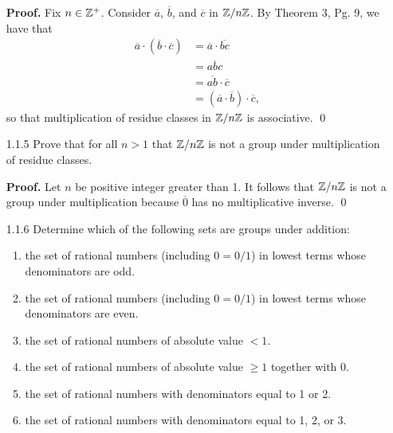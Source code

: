 \begin{enumerate}
      \textbf{Proof.} Fix $n \in \mathbb{Z}^+$. Consider $\overline{a}$, $\overline{b}$,
      and $\overline{c}$ in $\mathbb{Z}/n\mathbb{Z}$. By Theorem 3, Pg. 9, we have that
      \begin{align*}
         \overline{a} \cdot (\overline{b} \cdot \overline{c})
            &= \overline{a} \cdot \overline{bc} \\
            &= \overline{abc} \\
            &= \overline{ab} \cdot \overline{c} \\
            &= (\overline{a} \cdot \overline{b}) \cdot \overline{c},
      \end{align*}
      so that multiplication of residue classes in $\mathbb{Z}/n\mathbb{Z}$ is associative. \qed
   \item[1.1.5]   Prove that for all $n > 1$ that $\mathbb{Z}/n\mathbb{Z}$ is not a group under
                  multiplication of residue classes.
                  
      \textbf{Proof.} Let $n$ be positive integer greater than 1. It follows
      that $\mathbb{Z}/n\mathbb{Z}$ is not a group under multiplication because $\overline{0}$
      has no multiplicative inverse. \qed
   \item[1.1.6]   Determine which of the following sets are groups under
                  addition:
                  \begin{enumerate}
                     \item the set of rational numbers (including $0 = 0/1$) in
                           lowest terms whose denominators are odd.
                     \item the set of rational numbers (including $0 = 0/1$) in
                           lowest terms whose denominators are even.
                     \item the set of rational numbers of absolute value $< 1$.
                     \item the set of rational numbers of absolute value $\ge 1$
                           together with 0.
                     \item the set of rational numbers with denominators equal
                           to 1 or 2.
                     \item the set of rational numbers with denominators equal
                           to 1, 2, or 3.
                  \end{enumerate}


\end{enumerate}
